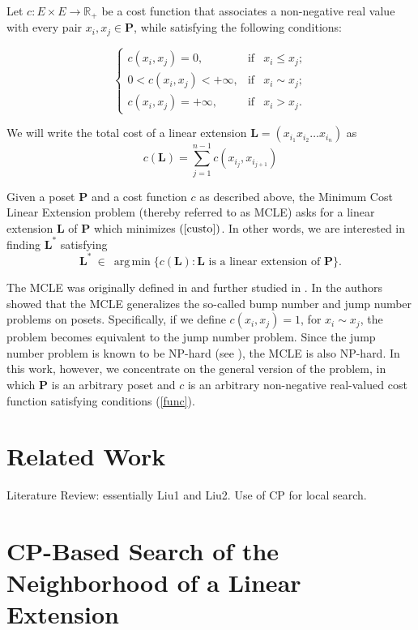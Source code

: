 \documentclass{llncs}
\DeclareMathOperator*{\argmin}{arg\,min}
\begin{document}
Let $c: E \times E \rightarrow \mathbb{R}_+$ be a cost function that associates a non-negative real value with every pair $x_i,x_j \in \mathbf{P}$, while satisfying the following conditions:

\begin{equation}
\left\{
\begin{array}{lll}
c(x_i,x_j)=0, & \mbox{if} & x_i \leq x_j;\\
0< c(x_i,x_j)< +\infty, & \mbox{if} & x_i \sim x_j;\\
c(x_i,x_j)=+\infty, & \mbox{if} & x_i>x_j.
\end{array}
\label{func} \right.
\end{equation}

We will write the total cost of a linear extension ${\mathbf L}=\left(x_{i_1} x_{i_2} \ldots x_{i_n}\right)$ as
\begin{equation}
\label{custo} \displaystyle c({\mathbf L})=\sum_{j=1}^{n-1}c(x_{i_j}, x_{i_{j+1}})
\end{equation}

Given a poset $\mathbf P$ and a cost function $c$ as described above, the Minimum Cost Linear Extension problem (thereby referred to as MCLE) asks for a linear extension $\mathbf L$ of $\mathbf P$ which minimizes $(\ref{custo})$. In other words, we are interested in finding $\mathbf{L}^*$ satisfying
\[
\mathbf{L}^* \:\in\: \argmin \{c(\mathbf{L}) : \mathbf{L} \mbox{ is a linear extension of } {\mathbf P} \}.
\]

The MCLE was originally defined in \cite{Liu} and further studied in \cite{Wu}.
In \cite{Liu} the authors showed that the MCLE
generalizes the so-called bump number and jump number problems on posets.
Specifically, if we define $c(x_i,x_j)=1$, for $x_i \sim x_j$, the problem becomes
equivalent to the jump number problem. Since the jump number problem is known to be NP-hard (see \cite{Bouchitte}), the MCLE is also NP-hard.
In this work, however, we concentrate on the general version of the problem, in
which $\mathbf P$ is an arbitrary poset and $c$ is an arbitrary non-negative real-valued cost function satisfying conditions (\ref{func}).


\section{Related Work}

Literature Review: essentially Liu1 and Liu2. Use of CP for local search.

\section{CP-Based Search of the Neighborhood of a Linear Extension}
\end{document}
